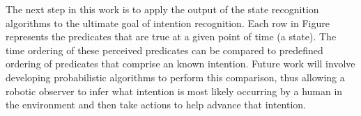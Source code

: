 \documentclass[final,1p,times]{elsarticle}
\begin{document}
The next step in this work is to apply the output of the state recognition algorithms to the ultimate goal of intention recognition. Each row in Figure  represents the predicates that are true at a given point of time (a state). The time ordering of these perceived predicates can be compared to predefined ordering of predicates that comprise an known intention. Future work will involve developing probabilistic algorithms to perform this comparison, thus allowing a robotic observer to infer what intention is most likely occurring by a human in the environment and then take actions to help advance that intention.

%

%
%

\end{document}
